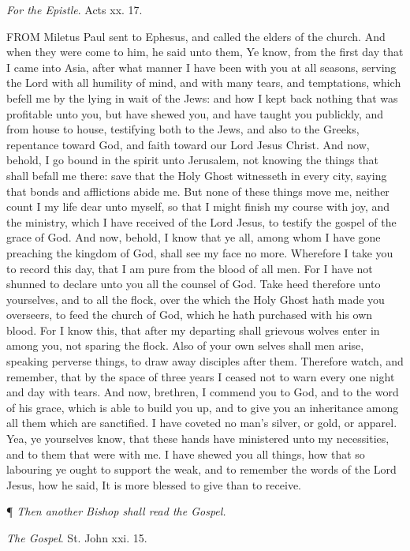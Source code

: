 \emph{For the Epistle}. Acts xx. 17.

FROM Miletus Paul sent
to Ephesus, and called the elders of the church. And when they were come
to him, he said unto them, Ye know, from the first day that I came into
Asia, after what manner I have been with you at all seasons, serving the
Lord with all humility of mind, and with many tears, and temptations,
which befell me by the lying in wait of the Jews: and how I kept back
nothing that was profitable unto you, but have shewed you, and have taught
you publickly, and from house to house, testifying both to the Jews, and
also to the Greeks, repentance toward God, and faith toward our Lord Jesus
Christ. And now, behold, I go bound in the spirit unto Jerusalem, not
knowing the things that shall befall me there: save that the Holy Ghost
witnesseth in every city, saying that bonds and afflictions abide me.
But none of these things move me, neither count I my life dear unto myself,
so that I might finish my course with joy, and the ministry, which I have
received of the Lord Jesus, to testify the gospel of the grace of God.
And now, behold, I know that ye all, among whom I have gone preaching
the kingdom of God, shall see my face no more. Wherefore I take you to
record this day, that I am pure from the blood of all men. For I have
not shunned to declare unto you all the counsel of God. Take heed therefore
unto yourselves, and to all the flock, over the which the Holy Ghost hath
made you overseers, to feed the church of God, which he hath purchased
with his own blood. For I know this, that after my departing shall grievous
wolves enter in among you, not sparing the flock. Also of your own selves
shall men arise, speaking perverse things, to draw away disciples after
them. Therefore watch, and remember, that by the space of three years
I ceased not to warn every one night and day with tears. And now, brethren,
I commend you to God, and to the word of his grace, which is able to build
you up, and to give you an inheritance among all them which are sanctified.
I have coveted no man's silver, or gold, or apparel. Yea, ye yourselves
know, that these hands have ministered unto my necessities, and to them
that were with me. I have shewed you all things, how that so labouring
ye ought to support the weak, and to remember the words of the Lord Jesus,
how he said, It is more blessed to give than to receive. 

¶
\emph{Then another Bishop shall read the Gospel.}

\emph{The
Gospel}. St. John xxi. 15.

